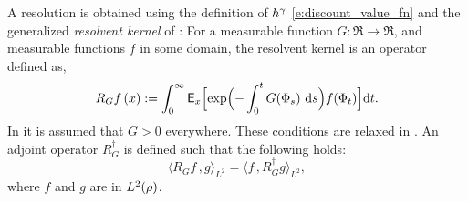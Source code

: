 A resolution is obtained using the definition of $h^\gamma$ \eqref{e:discount_value_fn} and the generalized \textit{resolvent kernel} of \cite{nev72,meytwe93e,devkonmey17a}: For a measurable function $G\colon\Re\to\Re$, and measurable functions $f$ in some domain, the resolvent kernel is an operator defined as,
\begin{equation}
R_G f\, (x) := \int_0^\infty \Expect_x\Bigl[ \exp\Bigl(-\int_0^t G(\markovstate_s)\, \rmd s \Bigr) f(\markovstate_t)\Bigr] \ud t.
\label{e:resolvent_neveu}
\end{equation}
In  \cite{nev72,meytwe93e} it is assumed that $G>0$ everywhere. These conditions are relaxed in \cite{konmey03a,devkonmey17a}. An adjoint operator $R^\dagger_G$ is defined such that the following holds:
\begin{equation}
\langle R_G f \, , g \rangle_{L^2} = \langle f \, , R^\dagger_G g \rangle_{L^2}, 
\label{e:RG_adjoint}
\end{equation}
where $f$ and $g$ are in $L^2(\rho)$. 

